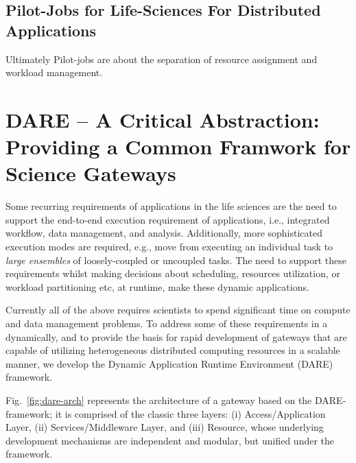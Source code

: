 \documentclass[]{article}
\begin{document}



\subsection{Pilot-Jobs for Life-Sciences For Distributed Applications}

Ultimately Pilot-jobs are about the separation of resource assignment and
workload management.


\section{DARE -- A Critical Abstraction: Providing a Common Framwork
  for Science Gateways}

Some recurring requirements of applications in the life sciences are
the need to support the end-to-end execution requirement of
applications, i.e., integrated workflow, data management, and
analysis.  Additionally, more sophisticated execution modes are
required, e.g., move from executing an individual task to
\textit{large ensembles} of loosely-coupled or uncoupled tasks. The
need to support these requirements whilst making decisions about
scheduling, resources utilization, or workload partitioning etc, at
runtime, make these dynamic applications.

Currently all of the above requires scientists to spend significant
time on compute and data management problems.  To address some of
these requirements in a dynamically, and to provide the basis for
rapid development of gateways that are capable of utilizing
heterogeneous distributed computing resources in a scalable manner, we
develop the Dynamic Application Runtime Environment (DARE)
framework\cite{dareurl}.

Fig.~\ref{fig:dare-arch} represents the architecture of a gateway
based on the DARE-framework; it is comprised of the classic three
layers: (i) Access/Application Layer, (ii) Services/Middleware Layer,
and (iii) Resource, whose underlying development mechanisms are
independent and modular, but unified under the framework.
\end{document}
